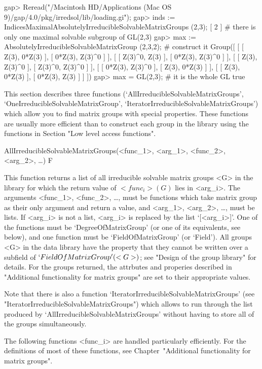 \beginexample
gap> Reread("/Macintosh HD/Applications (Mac OS 9)/gap/4.0/pkg/irredsol/lib/loading.gi");
gap> inds := IndicesMaximalAbsolutelyIrreducibleSolvableMatrixGroups (2,3);
[ 2 ] # there is only one maximal solvable subgroup of GL(2,3)
gap> max := AbsolutelyIrreducibleSolvableMatrixGroup (2,3,2); # construct it
Group([ [ [ Z(3), 0*Z(3) ], [ 0*Z(3), Z(3)^0 ] ], [ [ Z(3)^0, Z(3) ], [ 0*Z(3), Z(3)^0 ] ], 
  [ [ Z(3), Z(3)^0 ], [ Z(3)^0, Z(3)^0 ] ], [ [ 0*Z(3), Z(3)^0 ], [ Z(3), 0*Z(3) ] ], 
  [ [ Z(3), 0*Z(3) ], [ 0*Z(3), Z(3) ] ] ])
gap> max = GL(2,3); # it is the whole GL
true
\endexample



This section describes three functions
(`AllIrreducibleSolvableMatrixGroups',
`OneIrreducibleSolvableMatrixGroup',
`IteratorIrreducibleSolvableMatrixGroups') which allow you to find matrix
groups with special properties. These functions are usually more efficient
than to construct each group in the library using the functions in Section
"Low level access functions".

\>AllIrreducibleSolvableMatrixGroups(<func_1>, <arg_1>, <func_2>, <arg_2>, \dots) F

This function returns a list of all irreducible solvable matrix
groups <G> in the {\IRREDSOL} library for which the return value of $<func_i>(G)$ lies in
<arg_i>.  The arguments <func_1>, <func_2>, \dots,
must be {\GAP} functions which take matrix group as their only argument and
return a value, and <arg_1>, <arg_2>,
\dots,  must be lists. If <arg_i> is not a list, <arg_i> is replaced by the list
`[<arg_i>]'. One of the functions must be `DegreeOfMatrixGroup' (or one of its
equivalents, see below), and one function must be  `FieldOfMatrixGroup' (or `Field'). All
groups <G> in the data library have the property that they cannot be written over a
subfield of $`FieldOfMatrixGroup'(<G>)$; see "Design of the group library" for details. 
For the groups returned, the attrbutes and properies described in
"Additional functionality for matrix groups" are set to their appropriate values.


Note that there is also a function `IteratorIrreducibleSolvableMatrixGroups' (see
"IteratorIrreducibleSolvableMatrixGroups") which allows to run through the list produced by
`AllIrreducibleSolvableMatrixGroups' without having to store all of the groups
simultaneously.

The following functions <func_i> are handled particularly efficiently. For the
definitions of most of these functions, see Chapter~"Additional functionality for matrix
groups".

